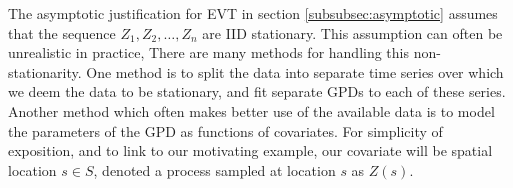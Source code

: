 \documentclass{article}
\numberwithin{equation}{section}
\begin{document}
The asymptotic justification for EVT in section \ref{subsubsec:asymptotic} assumes that the sequence $Z_1, Z_2, \ldots, Z_n$ are IID stationary.
This assumption can often be unrealistic in practice, 
There are many methods for handling this non-stationarity. 
One method is to split the data into separate time series over which we deem the data to be stationary, and fit separate GPDs to each of these series.
Another method which often makes better use of the available data is to model the parameters of the GPD as functions of covariates. 
For simplicity of exposition, and to link to our motivating example, our covariate will be spatial location $s \in S$, denoted a process sampled at location $s$ as $Z(s)$.
\end{document}
